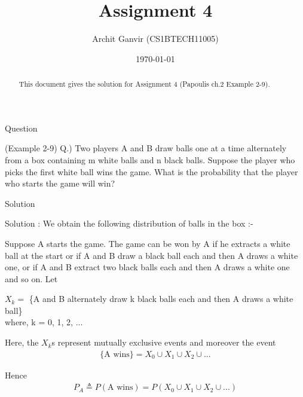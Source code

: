 \documentclass{beamer}
\title{Assignment 4}
\author{Archit Ganvir (CS1BTECH11005)}
\date{\today}
\begin{document}
\providecommand{\brak}[1]{\ensuremath{\left(#1\right)}}
\begin{frame}

\titlepage

\begin{abstract}
This document gives the solution for Assignment 4 (Papoulis ch.2 Example 2-9).
\end{abstract}

\end{frame}

\logo{}

\begin{frame}{Question}

(Example 2-9) Q.) Two players A and B draw balls one at a time alternately from a box containing m white balls and n black balls. Suppose the player who picks the first white ball wins the game. What is the probability that the player who starts the game will win?

\end{frame}

\begin{frame}{Solution}

Solution : We obtain the following distribution of balls in the box :-
\begin{table}[ht!]
	
\caption{}
\label{table:table1}

\end{table}

\end{frame}

\begin{frame}

Suppose A starts the game. The game can be won by A if he extracts a white ball at the start or if A and B draw a black ball each and then A draws a white one, or if A and B extract two black balls each and then A draws a white one and so on. Let

$X_k =$ \{A and B alternately draw k black balls each and then A draws a white ball\}\\
where, k = 0, 1, 2, ...

Here, the $X_k$s represent mutually exclusive events and moreover the event
\begin{align}
\{\text{A wins}\} = X_0 \cup X_1 \cup X_2 \cup ...
\end{align}

Hence
\begin{align}
P_A \triangleq P(\text{A wins}) = P(X_0 \cup X_1 \cup X_2 \cup ...) \label{eq:eq1}
\end{align}

\end{frame}
\end{document}
